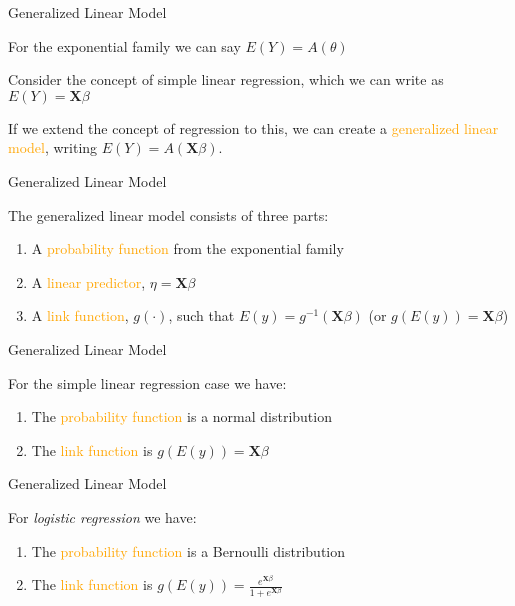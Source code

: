 \documentclass[
  12pt,
  ignorenonframetext,
]{beamer}
\providecommand{\tightlist}{%
  \setlength{\itemsep}{0pt}\setlength{\parskip}{0pt}}
\begin{document}
\begin{frame}{Generalized Linear Model}
\protect\hypertarget{generalized-linear-model}{}

For the exponential family we can say \(E(Y) = A(\theta)\)

Consider the concept of simple linear regression, which we can write as
\(E(Y) = \boldsymbol{X}\beta\)

If we extend the concept of regression to this, we can create a
\textcolor{orange}{generalized linear model}, writing
\(E(Y) = A(\boldsymbol{X}\beta)\).

\end{frame}

\begin{frame}{Generalized Linear Model}
\protect\hypertarget{generalized-linear-model-1}{}

The generalized linear model consists of three parts:

\begin{enumerate}[<+->]
\tightlist
\item
  A \textcolor{orange}{probability function} from the exponential family
\item
  A \textcolor{orange}{linear predictor}, \(\eta = \boldsymbol{X}\beta\)
\item
  A \textcolor{orange}{link function}, \(g(\cdot)\), such that
  \(E(y)=g^{-1}(\boldsymbol{X}\beta)\) (or
  \(g(E(y))=\boldsymbol{X}\beta\))
\end{enumerate}

\end{frame}

\begin{frame}{Generalized Linear Model}
\protect\hypertarget{generalized-linear-model-2}{}

For the simple linear regression case we have:

\begin{enumerate}[<+->]
\tightlist
\item
  The \textcolor{orange}{probability function} is a normal distribution
\item
  The \textcolor{orange}{link function} is
  \(g(E(y))= \boldsymbol{X}\beta\)
\end{enumerate}

\end{frame}

\begin{frame}{Generalized Linear Model}
\protect\hypertarget{generalized-linear-model-3}{}

For \emph{logistic regression} we have:

\begin{enumerate}[<+->]
\tightlist
\item
  The \textcolor{orange}{probability function} is a Bernoulli
  distribution
\item
  The \textcolor{orange}{link function} is
  \(g(E(y))=\frac{e^{\boldsymbol{X}\beta}}{1+e^{\boldsymbol{X}\beta}}\)
\end{enumerate}

\end{frame}
\end{document}
